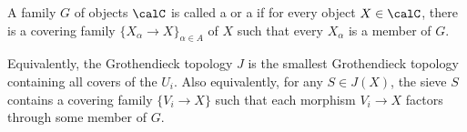 \begin{definition}
\begin{enumerate}
        A family $G$ of objects $\calC$ is called a  or a  if for every object $X \in \calC$, there is a covering family $\{X_\alpha \to X\}_{\alpha \in A}$ of $X$ such that every $X_\alpha$ is a member of $G$.  

        Equivalently, the Grothendieck topology $J$ is the smallest Grothendieck topology containing all covers of the $U_i$. Also equivalently, for any $S \in J(X)$, the sieve $S$ contains a covering family $\{V_i \to X\}$ such that each morphism $V_i \to X$ factors through some member of $G$. 
        



    \end{enumerate}
\end{definition}
